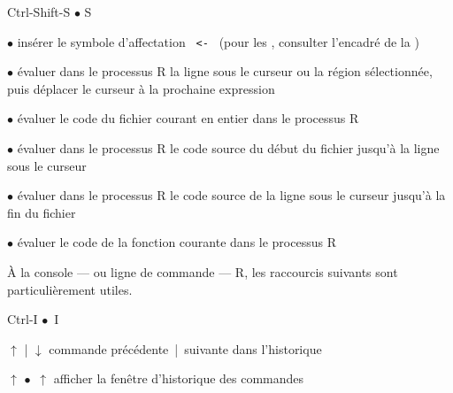 \begin{ttscript}{Ctrl-Shift-S $\bullet$ \cmdkey\shiftkey S}
\item[\code{Alt+-} $\bullet$ \code{\optkey\,-}] insérer le symbole
  d'affectation \verb*| <- | (pour les
  , consulter l'encadré de la
  )
\item[\code{Ctrl+Retour} $\bullet$ \code{\cmdkey\,\returnkey}]
  évaluer dans le processus R la ligne sous le curseur ou la région
  sélectionnée, puis déplacer le curseur à la prochaine expression
\item[\code{Ctrl+Shift+S} $\bullet$ \code{\shiftkey\,\cmdkey\,S}]
  évaluer le code du fichier courant en entier dans le processus R
\item[\code{Ctrl+Alt+B} $\bullet$ \code{\optkey\,\cmdkey\,B}]
  évaluer dans le processus R le code source du début du fichier
  jusqu'à la ligne sous le curseur
\item[\code{Ctrl+Alt+E} $\bullet$ \code{\optkey\,\cmdkey\,E}]
  évaluer dans le processus R le code source de la ligne sous le curseur
  jusqu'à la fin du fichier
\item[\code{Ctrl+Alt+F} $\bullet$ \code{\optkey\,\cmdkey\,F}]
  évaluer le code de la fonction courante dans le processus R
\end{ttscript}

À la console --- ou ligne de commande --- R, les raccourcis suivants
sont particulièrement utiles.
\begin{ttscript}{Ctrl-I $\bullet$ \cmdkey\,I}
\item[$\uparrow$ | $\downarrow$] commande
  précédente~|~suivante dans l'historique
\item[\code{Ctrl+}$\uparrow$ $\bullet$ \cmdkey\,$\uparrow$] afficher
  la fenêtre d'historique des commandes
\end{ttscript}

